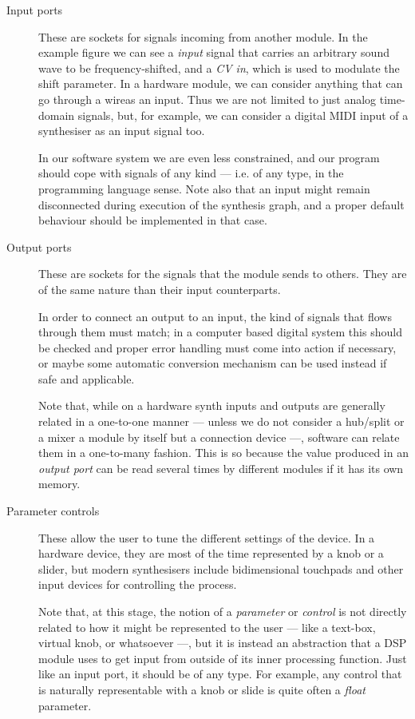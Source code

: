 \begin{description}
\item[Input ports] These are sockets for signals
  incoming from another module. In the example figure we can see a
  \emph{input} signal that carries an arbitrary sound wave to be
  frequency-shifted, and a \emph{CV in}, which is used to modulate the
  shift parameter. In a hardware module, we can consider anything that
  can go through a wireas an input. Thus we are not limited to just
  analog time-domain signals, but, for example, we can consider a
  digital MIDI input of a synthesiser as an input signal too.

  In our software system we are even less constrained, and our program
  should cope with signals of any kind --- i.e. of any type, in the
  programming language sense. Note also that an input might remain
  disconnected during execution of the synthesis graph, and a proper
  default behaviour should be implemented in that case.

\item[Output ports] These are sockets for the
  signals that the module sends to others. They are of the same nature
  than their input counterparts.

  In order to connect an output to an input, the kind of signals that
  flows through them must match; in a computer based digital system
  this should be checked and proper error handling must come into
  action if necessary, or maybe some automatic conversion mechanism
  can be used instead if safe and applicable.

  Note that, while on a hardware synth inputs and outputs are
  generally related in a one-to-one manner --- unless we do not
  consider a hub/split or a mixer a module by itself but a connection
  device ---, software can relate them in a one-to-many fashion. This
  is so because the value produced in an \emph{output port} can be
  read several times by different modules if it has its own memory.

\item[Parameter controls] These allow the
  user to tune the different settings of the device. In a hardware
  device, they are most of the time represented by a knob or a slider,
  but modern synthesisers include bidimensional touchpads and other
  input devices for controlling the process.

  Note that, at this stage, the notion of a \emph{parameter} or
  \emph{control} is not directly related to how it might be
  represented to the user --- like a text-box, virtual knob, or
  whatsoever ---, but it is instead an abstraction that a DSP
  module uses to get input from outside of its inner processing
  function. Just like an input port, it should be of any type. For
  example, any control that is naturally representable with a knob or
  slide is quite often a \emph{float} parameter.


\end{description}
